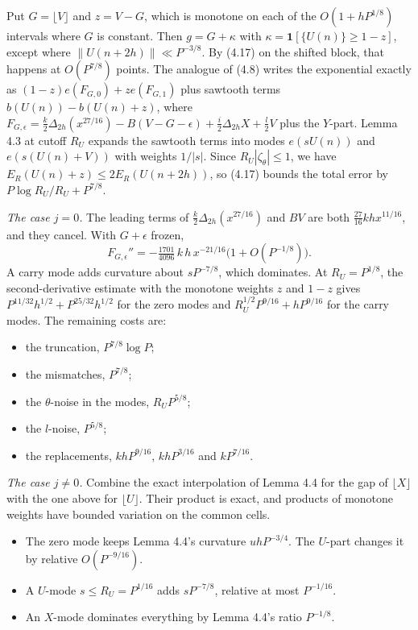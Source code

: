 \documentclass[11pt,a4paper]{article}
\providecommand{\tightlist}{\setlength{\itemsep}{0pt}\setlength{\parskip}{0pt}}
\begin{document}
Put \(G=\lfloor V\rfloor\) and \(z=V-G\), which is monotone on each of
the \(O(1+hP^{1/8})\) intervals where \(G\) is constant. Then
\(g=G+\kappa\) with \(\kappa=\mathbf 1[\{U(n)\}\ge1-z]\), except where
\(\|U(n+2h)\|\ll P^{-3/8}\). By (4.17) on the shifted block, that
happens at \(O(P^{7/8})\) points. The analogue of (4.8) writes the
exponential exactly as \((1-z)e(F_{G,0})+ze(F_{G,1})\) plus sawtooth
terms \(b(U(n))-b(U(n)+z)\), where
\(F_{G,\epsilon}=\tfrac k2\Delta_{2h}(x^{27/16})-B(V-G-\epsilon)
+\tfrac i2\Delta_{2h}X+\tfrac l2V\) plus the \(Y\)-part. Lemma 4.3 at
cutoff \(R_U\) expands the sawtooth terms into modes \(e(sU(n))\) and
\(e(s(U(n)+V))\) with weights \(1/|s|\). Since
\(R_U|\zeta_\theta|\le1\), we have \(E_R(U(n)+z)\le2E_R(U(n+2h))\), so
(4.17) bounds the total error by \(P\log R_U/R_U+P^{7/8}\).

\emph{The case \(j=0\).} The leading terms of
\(\tfrac k2\Delta_{2h}(x^{27/16})\) and \(BV\) are both
\(\tfrac{27}{16}khx^{11/16}\), and they cancel. With \(G+\epsilon\)
frozen, \[
F_{G,\epsilon}''=-\tfrac{1701}{4096}\,k\,h\,x^{-21/16}
\bigl(1+O(P^{-1/8})\bigr).
\tag{D.7}
\] A carry mode adds curvature about \(sP^{-7/8}\), which dominates. At
\(R_U=P^{1/8}\), the second-derivative estimate with the monotone
weights \(z\) and \(1-z\) gives \(P^{11/32}h^{1/2}+P^{25/32}h^{1/2}\)
for the zero modes and \(R_U^{1/2}P^{9/16}+hP^{9/16}\) for the carry
modes. The remaining costs are:

\begin{itemize}
\tightlist
\item
  the truncation, \(P^{7/8}\log P\);
\item
  the mismatches, \(P^{7/8}\);
\item
  the \(\theta\)-noise in the modes, \(R_UP^{5/8}\);
\item
  the \(l\)-noise, \(P^{5/8}\);
\item
  the replacements, \(khP^{9/16}\), \(khP^{3/16}\) and \(kP^{7/16}\).
\end{itemize}

\emph{The case \(j\ne0\).} Combine the exact interpolation of Lemma 4.4
for the gap of \(\lfloor X\rfloor\) with the one above for
\(\lfloor U\rfloor\). Their product is exact, and products of monotone
weights have bounded variation on the common cells.

\begin{itemize}
\tightlist
\item
  The zero mode keeps Lemma 4.4's curvature \(uhP^{-3/4}\). The
  \(U\)-part changes it by relative \(O(P^{-9/16})\).
\item
  A \(U\)-mode \(s\le R_U=P^{1/16}\) adds \(sP^{-7/8}\), relative at
  most \(P^{-1/16}\).
\item
  An \(X\)-mode dominates everything by Lemma 4.4's ratio \(P^{-1/8}\).
\end{itemize}
\end{document}
